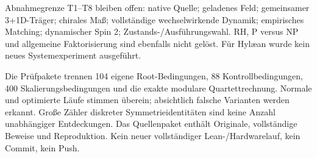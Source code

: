 \begin{grenze}{Abnahmegrenze}
T1--T8 bleiben offen: native Quelle; geladenes Feld; gemeinsamer 3+1D-Träger; chirales Maß; vollständige wechselwirkende Dynamik; empirisches Matching; dynamischer Spin 2; Zustands-/Ausführungswahl. RH, P versus NP und allgemeine Faktorisierung sind ebenfalls nicht gelöst. Für Hylæan wurde kein neues Systemexperiment ausgeführt.
\end{grenze}

Die Prüfpakete trennen 104 eigene Root-Bedingungen, 88 Kontrollbedingungen, 400 Skalierungsbedingungen und die exakte modulare Quartettrechnung. Normale und optimierte Läufe stimmen überein; absichtlich falsche Varianten werden erkannt. Große Zähler diskreter Symmetrieidentitäten sind keine Anzahl unabhängiger Entdeckungen. Das Quellenpaket enthält Originale, vollständige Beweise und Reproduktion. Kein neuer vollständiger Lean-/Hardwarelauf, kein Commit, kein Push.
